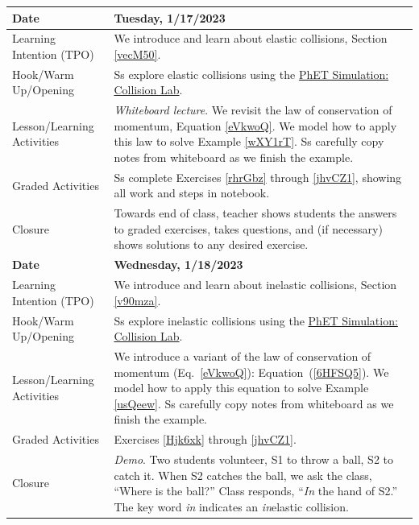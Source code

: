 \documentclass{article}
\numberwithin{equation}{section}
\numberwithin{figure}{section}
\begin{document}
\begin{tabular}{|m{}|m{}|}
    \hline
    \cellcolor{black!20}\textbf{Date} & \cellcolor{black!20}\textbf{Tuesday, 1/17/2023} \\
    \hline
    Learning Intention (TPO) & We introduce and learn about elastic collisions, Section \ref{vecM50}.\\
    \hline
    Hook/Warm Up/Opening & Ss explore elastic collisions using the \href{https://phet.colorado.edu/en/simulations/collision-lab}{PhET Simulation: Collision Lab}.\\
    \hline
    Lesson/Learning Activities & \textit{Whiteboard lecture}. We revisit the law of conservation of momentum, Equation \ref{eVkwoQ}. We model how to apply this law to solve Example \ref{wXY1rT}. Ss carefully copy notes from whiteboard as we finish the example. \\
    \hline
    Graded Activities & Ss complete Exercises \ref{rhrGbz} through \ref{jhvCZ1}, showing all work and steps in notebook. \\
    \hline
    Closure & Towards end of class, teacher shows students the answers to graded exercises, takes questions, and (if necessary) shows solutions to any desired exercise.\\
    \hline
    \hline

    \cellcolor{black!20}\textbf{Date} & \cellcolor{black!20}\textbf{Wednesday, 1/18/2023} \\
    \hline
    Learning Intention (TPO) & We introduce and learn about inelastic collisions, Section \ref{v90mza}.\\
    \hline
    Hook/Warm Up/Opening & Ss explore inelastic collisions using the \href{https://phet.colorado.edu/en/simulations/collision-lab}{PhET Simulation: Collision Lab}.\\
    \hline
    Lesson/Learning Activities & We introduce a variant of the law of conservation of momentum (Eq.~\ref{eVkwoQ}): Equation~(\ref{6HFSQ5}). We model how to apply this equation to solve Example \ref{usQeew}. Ss carefully copy notes from whiteboard as we finish the example. \\
    \hline
    Graded Activities & Exercises \ref{Hjk6xk} through \ref{jhvCZ1}.\\
    \hline
    Closure & \textit{Demo}. Two students volunteer, S1 to throw a ball, S2 to catch it. When S2 catches the ball, we ask the class, ``Where is the ball?'' Class responds, ``{\color{red}\textit{In}} the hand of S2.'' The key word {\color{red}\textit{in}} indicates an {\color{red}\textit{in}}elastic collision. \\
    \hline
    \hline


\end{tabular}
\end{document}
